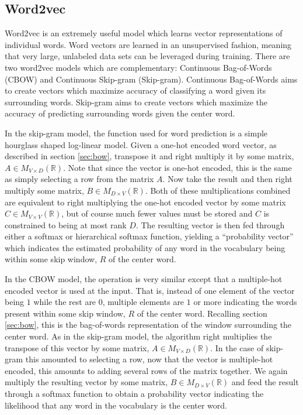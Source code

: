 \subsection{Word2vec}
Word2vec \cite{tm13_og} is an extremely useful model which learns vector representations of individual words.  Word vectors are learned in an unsupervised fashion, meaning that very large, unlabeled data sets can be leveraged during training.  There are two word2vec models which are complementary:  Continuous Bag-of-Words (CBOW) and Continuous Skip-gram (Skip-gram).  Continuous Bag-of-Words aims to create vectors which maximize accuracy of classifying a word given its surrounding words.  Skip-gram aims to create vectors which maximize the accuracy of predicting surrounding words given the center word.

In the skip-gram model, the function used for word prediction is a simple hourglass shaped log-linear model.  Given a one-hot encoded word vector, as described in section \ref{sec:bow}, transpose it and right multiply it by some matrix, $A \in M_{V\times D}(\mathbb{R})$.  Note that since the vector is one-hot encoded, this is the same as simply selecting a row from the matrix $A$.  Now take the result and then right multiply some matrix, $B \in M_{D\times V}(\mathbb{R})$.  Both of these multiplications combined are equivalent to right multiplying the one-hot encoded vector by some matrix $C \in M_{V\times V}(\mathbb{R})$, but of course much fewer values must be stored and $C$ is constrained to being at most rank $D$.  The resulting vector is then fed through either a softmax or hierarchical softmax function, yielding a ``probability vector'' which indicates the estimated probability of any word in the vocabulary being within some skip window, $R$ of the center word.

In the CBOW model, the operation is very similar except that a multiple-hot encoded vector is used at the input.  That is, instead of one element of the vector being $1$ while the rest are $0$, multiple elements are $1$ or more indicating the words present within some skip window, $R$ of the center word.  Recalling section \ref{sec:bow}, this is the bag-of-words representation of the window surrounding the center word.  As in the skip-gram model, the algorithm right multiplies the transpose of this vector by some matrix, $A \in M_{V\times D}(\mathbb{R})$.  In the case of skip-gram this amounted to selecting a row, now that the vector is multiple-hot encoded, this amounts to adding several rows of the matrix together.  We again multiply the resulting vector by some matrix, $B \in M_{D\times V}(\mathbb{R})$ and feed the result through a softmax function to obtain a probability vector indicating the likelihood that any word in the vocabulary is the center word.

